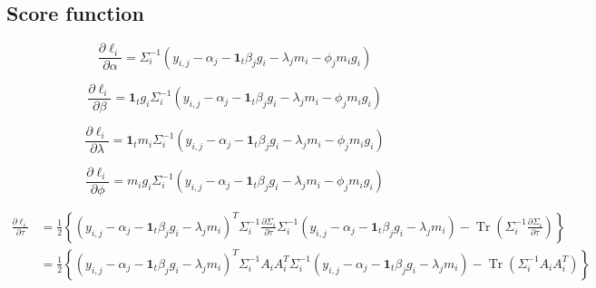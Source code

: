 \documentclass[hidelinks]{article}
\DeclareMathOperator{\Tr}{Tr}
\begin{document}
\subsection{Score function}

\begingroup
\large
\begin{equation*}
\frac{\partial \ell_i }{\partial \alpha} = \Sigma_i^{-1} \left(y_{i,j}-\alpha_{j}- \textbf{1}_t \beta_j g_i - \lambda_j m_{i} - \phi_j m_{i}g_i\right)
\end{equation*}
\endgroup

\begingroup
\large
\begin{equation*}
\frac{\partial \ell_i }{\partial \beta} =  \textbf{1}_t g_i\Sigma_i^{-1} \left(y_{i,j}-\alpha_{j}- \textbf{1}_t \beta_j g_i - \lambda_j m_{i} -  \phi_j m_{i}g_i\right)
\end{equation*}
\endgroup

\begingroup
\large
\begin{equation*}
\frac{\partial \ell_i }{\partial \lambda} =  \textbf{1}_t m_{i}\Sigma_i^{-1} \left(y_{i,j}-\alpha_{j}- \textbf{1}_t \beta_j g_i - \lambda_j m_{i} -  \phi_j m_{i}g_i\right)
\end{equation*}
\endgroup

\begingroup
\large
\begin{equation*}
\frac{\partial \ell_i }{\partial \phi} =   m_{i}g_i \Sigma_i^{-1} \left(y_{i,j}-\alpha_{j}- \textbf{1}_t \beta_j g_i - \lambda_j m_{i} -  \phi_j m_{i}g_i\right)
\end{equation*}
\endgroup


\begingroup
\large
\begin{equation*}
\begin{split}
\frac{\partial \ell_i }{\partial \tau} &= \frac{1}{2} \left\{ \left(y_{i,j}-\alpha_{j}-\textbf{1}_t \beta_j g_i - \lambda_j m_i \right)^T \Sigma_i^{-1} \frac{\partial \Sigma_i }{\partial \tau}\Sigma_i^{-1} \left(y_{i,j}-\alpha_{j}-\textbf{1}_t \beta_j g_i- \lambda_j m_i \right) - \Tr \left( \Sigma_i^{-1}  \frac{\partial \Sigma_i }{\partial \tau}\right) \right\}\\
&=\frac{1}{2} \left\{ \left(y_{i,j}-\alpha_{j}-\textbf{1}_t \beta_j g_i - \lambda_j m_i\right)^T \Sigma_i^{-1} A_i A_i^T \Sigma_i^{-1}  \left(y_{i,j}-\alpha_{j}-\textbf{1}_t \beta_j g_i - \lambda_j m_i\right) - \Tr \left( \Sigma_i^{-1}  A_i A_i^T\right) \right\} \\
\end{split}
\end{equation*}
\endgroup
\end{document}
